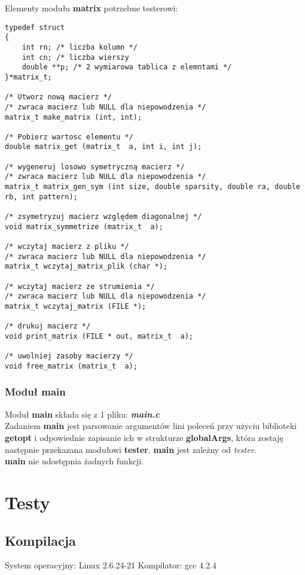 \documentclass[bibtotocnumbered, headsepline,normalheadings,12pt,polish]{scrreprt}
\begin{document}
Elementy modułu \textbf{matrix} potrzebne testerowi:
\small
\begin{verbatim}
typedef struct
{
    int rn; /* liczba kolumn */
    int cn; /* liczba wierszy
    double **p; /* 2 wymiarowa tablica z elemntami */
}*matrix_t;

/* Utworz nową macierz */
/* zwraca macierz lub NULL dla niepowodzenia */
matrix_t make_matrix (int, int);

/* Pobierz wartosc elementu */
double matrix_get (matrix_t  a, int i, int j);

/* wygeneruj losowo symetryczną macierz */
/* zwraca macierz lub NULL dla niepowodzenia */
matrix_t matrix_gen_sym (int size, double sparsity, double ra, double rb, int pattern);

/* zsymetryzuj macierz względem diagonalnej */
void matrix_symmetrize (matrix_t  a);

/* wczytaj macierz z pliku */
/* zwraca macierz lub NULL dla niepowodzenia */
matrix_t wczytaj_matrix_plik (char *);

/* wczytaj macierz ze strumienia */
/* zwraca macierz lub NULL dla niepowodzenia */
matrix_t wczytaj_matrix (FILE *);

/* drukuj macierz */
void print_matrix (FILE * out, matrix_t  a);

/* uwolniej zasoby macierzy */
void free_matrix (matrix_t  a);

\end{verbatim}
\subsection{Moduł main}
\normalsize
Moduł \textbf{main} składa się z 1 pliku: \textit{\textbf{main.c}}\\
Zadaniem \textbf{main} jest parsowanie argumentów lini poleceń przy użyciu biblioteki \textbf{getopt} i odpowiednie zapisanie ich w strukturze \textbf{globalArgs}, która zostaję następnie przekazana modułowi \textbf{tester}.
\textbf{main} jest zależny od \large{\emph{tester}}.\normalsize\\
\textbf{main} nie udostępnia żadnych funkcji.

\chapter{Testy}
\normalsize
\section{Kompilacja}
System operacyjny: Linux 2.6.24-21
Kompilator: gcc 4.2.4
\end{document}

